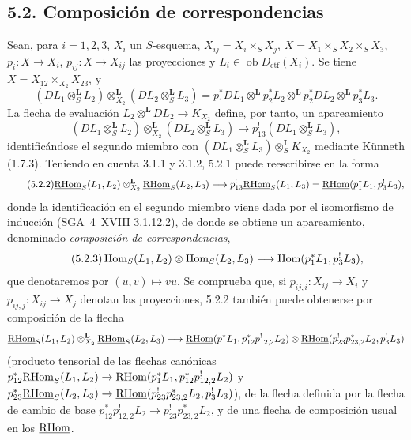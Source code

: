 \subsection*{5.2. Composición de correspondencias}

Sean, para $i=1,2,3$, $X_i$ un $S$-esquema, $X_{ij}=X_i\times_SX_j$, $X=X_1\times_SX_2\times_SX_3$, $p_i:X\to X_i$, $p_{ij}:X\to X_{ij}$ las proyecciones y $L_i\in\operatorname{ob}D_{\mathrm{ctf}}(X_i)$. Se tiene $X=X_{12}\times_{X_2}X_{23}$, y
\[
(DL_1\otimes_S^{\mathbf L}L_2)\otimes_{X_2}^{\mathbf L}(DL_2\otimes_S^{\mathbf L}L_3)
=p_1^*DL_1\otimes^{\mathbf L}p_2^*L_2\otimes^{\mathbf L}p_2^*DL_2\otimes^{\mathbf L}p_3^*L_3.
\]
La flecha de evaluación $L_2\otimes^{\mathbf L}DL_2\to K_{X_2}$ define, por tanto, un apareamiento
\begin{equation}
\tag{5.2.1}
(DL_1\otimes_S^{\mathbf L}L_2)\otimes_{X_2}^{\mathbf L}(DL_2\otimes_S^{\mathbf L}L_3)\longrightarrow p_{13}^!(DL_1\otimes_S^{\mathbf L}L_3),
\end{equation}
identificándose el segundo miembro con $(DL_1\otimes_S^{\mathbf L}L_3)\otimes_S^{\mathbf L}K_{X_2}$ mediante Künneth (1.7.3). Teniendo en cuenta 3.1.1 y 3.1.2, 5.2.1 puede reescribirse en la forma
\begin{equation}
\tag{5.2.2}
\underline{\mathrm{RHom}}_S(L_1,L_2)\otimes_{X_2}^{\mathbf L}\underline{\mathrm{RHom}}_S(L_2,L_3)\longrightarrow p_{13}^!\underline{\mathrm{RHom}}_S(L_1,L_3)=\underline{\mathrm{RHom}}(p_1^*L_1,p_3^!L_3),
\end{equation}
donde la identificación en el segundo miembro viene dada por el isomorfismo de inducción (SGA~4~XVIII 3.1.12.2), de donde se obtiene un apareamiento, denominado \emph{composición de correspondencias},
\begin{equation}
\tag{5.2.3}
\operatorname{Hom}_S(L_1,L_2)\otimes\operatorname{Hom}_S(L_2,L_3)\longrightarrow\operatorname{Hom}(p_1^*L_1,p_3^!L_3),
\end{equation}
que denotaremos por $(u,v)\mapsto vu$. Se comprueba que, si $p_{ij,i}:X_{ij}\to X_i$ y $p_{ij,j}:X_{ij}\to X_j$ denotan las proyecciones, 5.2.2 también puede obtenerse por composición de la flecha
\[
\underline{\mathrm{RHom}}_S(L_1,L_2)\otimes_{X_2}^{\mathbf L}\underline{\mathrm{RHom}}_S(L_2,L_3)
\longrightarrow
\underline{\mathrm{RHom}}(p_1^*L_1,p_{12}^*p_{12,2}^!L_2)
\otimes
\underline{\mathrm{RHom}}(p_{23}^!p_{23,2}^*L_2,p_3^!L_3)
\]
(producto tensorial de las flechas canónicas $p_{12}^*\underline{\mathrm{RHom}}_S(L_1,L_2)\to\underline{\mathrm{RHom}}(p_1^*L_1,p_{12}^*p_{12,2}^!L_2)$ y $p_{23}^*\underline{\mathrm{RHom}}_S(L_2,L_3)\to\underline{\mathrm{RHom}}(p_{23}^!p_{23,2}^*L_2,p_3^!L_3)$), de la flecha definida por la flecha de cambio de base $p_{12}^*p_{12,2}^!L_2\to p_{23}^!p_{23,2}^*L_2$, y de una flecha de composición usual en los $\underline{\mathrm{RHom}}$.

